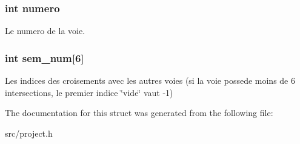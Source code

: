 \subsubsection[{numero}]{\setlength{\rightskip}{0pt plus 5cm}int numero}\label{struct_voie_a2c30f43104974e72e2809fb4569804b0}
Le numero de la voie. \hypertarget{struct_voie_ac9436ae55f35dfc5e3dc8e676c73aeb5}{}
\subsubsection[{sem\+\_\+num}]{\setlength{\rightskip}{0pt plus 5cm}int sem\+\_\+num\mbox{[}6\mbox{]}}\label{struct_voie_ac9436ae55f35dfc5e3dc8e676c73aeb5}
Les indices des croisements avec les autres voies (si la voie possede moins de 6 intersections, le premier indice \char`\"{}vide\char`\"{} vaut -\/1) 

The documentation for this struct was generated from the following file\+:\begin{DoxyCompactItemize}
\item 
src/project.\+h\end{DoxyCompactItemize}
